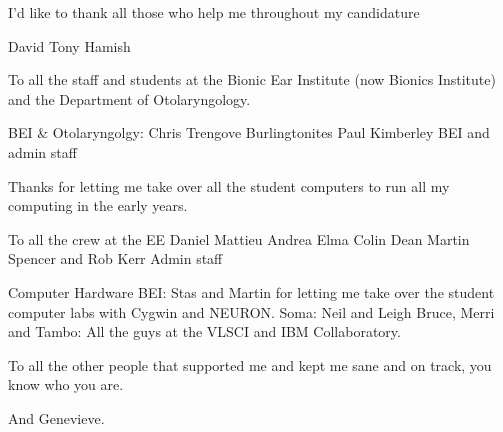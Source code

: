 
\begin{acknowledgements}

I'd like to thank all those who help me throughout my candidature

David Tony Hamish

To all the staff and students at the Bionic Ear Institute (now Bionics Institute) and the Department of Otolaryngology.

BEI \& Otolaryngolgy: Chris Trengove
Burlingtonites
Paul
Kimberley
BEI and admin staff

Thanks for letting me take over all the student computers to run all my computing in the early years.




To all the crew at the 
EE
Daniel
Mattieu
Andrea
Elma
Colin
Dean
Martin Spencer and Rob Kerr
Admin staff

Computer Hardware
BEI: Stas and Martin for letting me take over the student computer labs with Cygwin and NEURON\@.
Soma: Neil and Leigh
Bruce, Merri and Tambo: All the guys at the VLSCI and IBM Collaboratory.


To all the other people that supported me and kept me sane and on track, you know who you are.

And Genevieve.















\end{acknowledgements}
